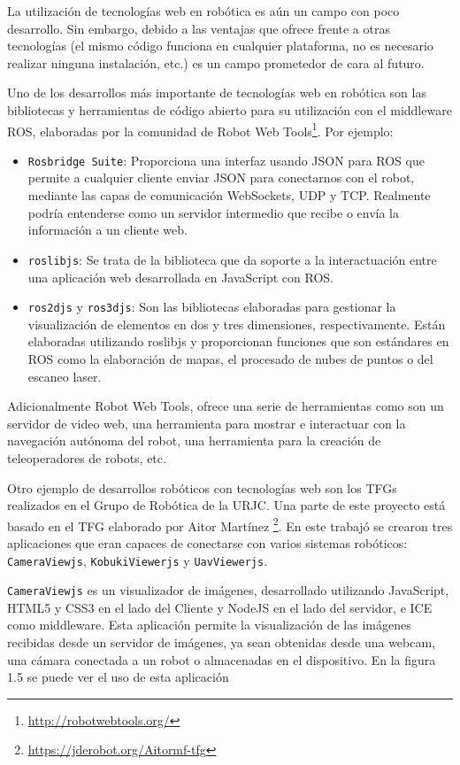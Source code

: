 La utilización de tecnologías web en robótica es aún un campo con poco desarrollo. Sin embargo, debido a las ventajas que ofrece frente a otras tecnologías (el mismo código funciona en cualquier plataforma, no es necesario realizar ninguna instalación, etc.) es un campo prometedor de cara al futuro.

Uno de los desarrollos más importante de tecnologías web en robótica son las bibliotecas y herramientas de código abierto para su utilización con el middleware ROS, elaboradas por la comunidad de Robot Web Tools\footnote{\url{http://robotwebtools.org/}}. Por ejemplo:
\begin{itemize}
	\item \texttt{Rosbridge Suite}: Proporciona una interfaz usando JSON para ROS que permite a cualquier cliente enviar JSON para conectarnos con el robot, mediante las capas de comunicación WebSockets, UDP y TCP. Realmente podría entenderse como un servidor intermedio que recibe o envía la información a un cliente web.
	\item \texttt{roslibjs}: Se trata de la biblioteca que da soporte a la interactuación entre una aplicación web desarrollada en JavaScript con ROS. 
	\item \texttt{ros2djs} y \texttt{ros3djs}: Son las bibliotecas elaboradas para gestionar la visualización de elementos en dos y tres dimensiones, respectivamente. Están elaboradas utilizando roslibjs y proporcionan funciones que son estándares en ROS como la elaboración de mapas, el procesado de nubes de puntos o del escaneo laser.
\end{itemize}

Adicionalmente Robot Web Tools, ofrece una serie de herramientas como son un servidor de video web, una herramienta para mostrar e interactuar con la navegación autónoma del robot, una herramienta para la creación de teleoperadores de robots, etc.

Otro ejemplo de desarrollos robóticos con tecnologías web son los TFGs realizados en el Grupo de Robótica de la URJC. Una parte de este proyecto está basado en el TFG elaborado por Aitor Martínez \footnote{\url{https://jderobot.org/Aitormf-tfg}}. En este trabajó se crearon tres aplicaciones que eran capaces de conectarse con varios sistemas robóticos: \texttt{CameraViewjs}, \texttt{KobukiViewerjs} y \texttt{UavViewerjs}.

\texttt{CameraViewjs} es un visualizador de imágenes, desarrollado utilizando JavaScript, HTML5 y CSS3 en el lado del Cliente y NodeJS en el lado del servidor, e ICE como middleware. Esta aplicación permite la visualización de las imágenes recibidas desde un servidor de imágenes, ya sean obtenidas desde una webcam, una cámara conectada a un robot o almacenadas en el dispositivo. En la figura 1.5 se puede ver el uso de esta aplicación

